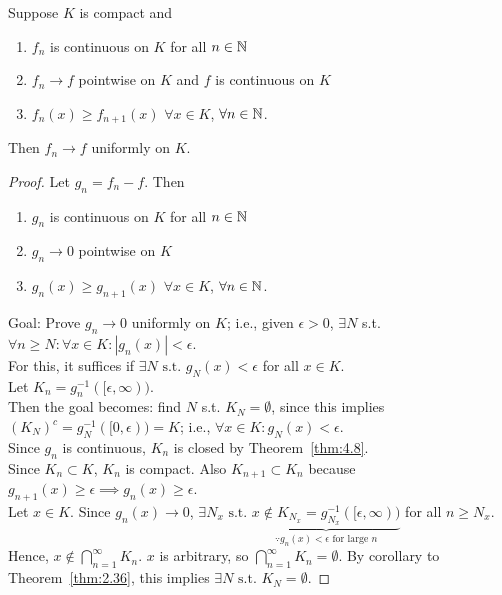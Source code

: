 \begin{thm}[13]
	Suppose $K$ is compact and
	\begin{enumerate}
		\item $f_n$ is continuous on $K$ for all $n \in \mathbb{N}$
		\item $f_{n}\to f$ pointwise on $K$ and $f$ is continuous on $K$
		\item $f_{n}(x)\ge f_{n+1}(x)$ $\forall x \in K$, $\forall n \in \mathbb{N}$.
	\end{enumerate}
	Then $f_{n}\to f$ uniformly on $K$.
	\begin{proof}
		Let $g_{n}=f_{n}-f$. Then
		\begin{enumerate}
			\item $g_{n}$ is continuous on $K$ for all $n \in \mathbb{N}$
			\item $g_{n}\to 0$ pointwise on $K$
			\item $g_{n}(x)\ge g_{n+1}(x)$ $\forall x \in K$, $\forall n \in \mathbb{N}$.
		\end{enumerate}
		Goal: Prove $g_{n}\to 0$ uniformly on $K$; i.e., given $\epsilon>0$, $\exists{N}$ s.t. $\forall{n\ge N}: \forall{x \in K}: \left|g_{n}(x)\right|<\epsilon$.\\
		For this, it suffices if $\exists{N} \text{ s.t. } g_N(x)<\epsilon$ for all $x \in K$.\\
		Let $K_n=g_n^{-1}([\epsilon,\infty))$.\\
		Then the goal becomes: find $N$ s.t. $K_{N}=\emptyset$, since this implies $\left(K_N\right)^{c}=g_{N}^{-1}([0,\epsilon))=K$; i.e., $\forall{x \in K}: g_N(x)<\epsilon$.\\
		Since $g_{n}$ is continuous, $K_{n}$ is closed by Theorem~\ref{thm:4.8}.\\
		Since $K_{n} \subset K$, $K_{n}$ is compact. Also $K_{n+1} \subset K_{n}$ because $g_{n+1}(x)\ge \epsilon \implies g_{n}(x)\ge \epsilon$.\\
		Let $x \in K$. Since $g_{n}(x)\to 0$, $\exists{N_{x}} \text{ s.t. } \underbrace{x \not\in K_{N_x}=g_{N_x}^{-1}([\epsilon,\infty))}_{\because g_{n}(x)<\epsilon \text{ for large } n}$ for all $n \ge N_x$.
		Hence, $x \not\in \bigcap_{n=1}^{\infty}K_n$.
		$x$ is arbitrary, so $\bigcap_{n=1}^{\infty}K_n=\emptyset$.
		By corollary to Theorem~\ref{thm:2.36}, this implies $\exists{N } \text{ s.t. } K_N=\emptyset$.
	\end{proof}
\end{thm}
